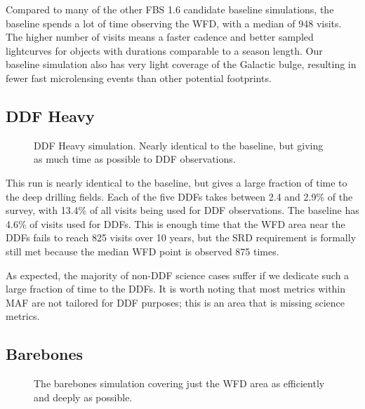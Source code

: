 Compared to many of the other FBS 1.6 candidate baseline simulations, the baseline spends a lot of time observing the WFD, with a median of 948 visits. The higher number of visits means a faster cadence and better sampled lightcurves for objects with durations comparable to a season length. Our baseline simulation also has very light coverage of the Galactic bulge, resulting in fewer fast microlensing events than other potential footprints. 

\subsection{DDF Heavy}\label{ss:1.6ddfheavy}

\begin{figure}
\caption{DDF Heavy simulation. Nearly identical to the baseline, but giving as much time as possible to DDF observations.}\label{fig:ddfheavy}
\end{figure}


This run is nearly identical to the baseline, but gives a large fraction of time to the deep drilling fields. Each of the five DDFs takes between 2.4 and 2.9\% of the survey, with 13.4\% of all visits being used for DDF observations. The baseline has 4.6\% of visits used for DDFs.  This is enough time that the WFD area near the DDFs fails to reach 825 visits over 10 years, but the SRD requirement is formally still met because the median WFD point is observed 875 times.

As expected, the majority of non-DDF science cases suffer if we dedicate such a large fraction of time to the DDFs. It is worth noting that most metrics within MAF are not tailored for DDF purposes; this is an area that is missing science metrics.

\subsection{Barebones}\label{ss:1.6barebones}

\begin{figure}
\caption{The barebones simulation covering just the WFD area as efficiently and deeply as possible.}\label{fig:barebones}
\end{figure}


